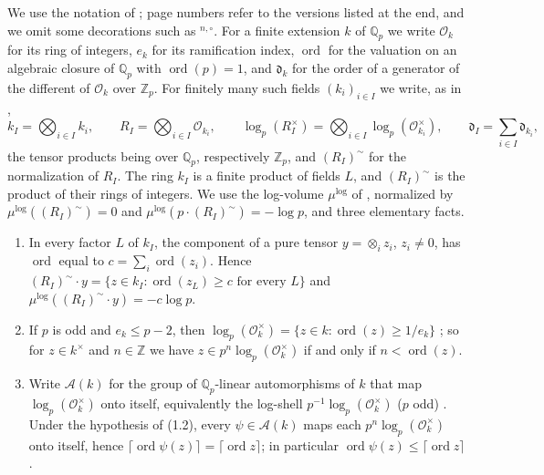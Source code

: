 \documentclass[11pt]{amsart}
\theoremstyle{remark}
\newcommand{\Z}{\mathbb Z}
\newcommand{\Qp}{\mathbb Q_p}
\newcommand{\Zp}{\mathbb Z_p}
\newcommand{\cO}{\mathcal O}
\newcommand{\cA}{\mathcal A}
\newcommand{\dd}{\mathfrak d}
\newcommand{\mulog}{\mu^{\log}}
\newcommand{\RIt}{(R_I)^{\sim}}
\begin{document}
We use the notation of \cite{IUT1,IUT3,IUT4}; page numbers refer to the versions listed at the end, and we
omit some decorations such as ${}^{n,\circ}$. For a finite extension $k$ of $\Qp$ we write $\cO_k$ for its ring
of integers, $e_k$ for its ramification index, $\operatorname{ord}$ for the valuation on an algebraic closure of
$\Qp$ with $\operatorname{ord}(p)=1$, and $\dd_k$ for the order of a generator of the different of $\cO_k$ over
$\Zp$. For finitely many such fields $(k_i)_{i\in I}$ we write, as in \cite[Props.~1.1, 1.2, pp.~9--10]{IUT4},
\[
k_I=\textstyle\bigotimes_{i\in I}k_i,\qquad R_I=\bigotimes_{i\in I}\cO_{k_i},\qquad
\log_p(R_I^\times)=\bigotimes_{i\in I}\log_p(\cO_{k_i}^\times),\qquad \dd_I=\sum_{i\in I}\dd_{k_i},
\]
the tensor products being over $\Qp$, respectively $\Zp$, and $\RIt$ for the normalization of $R_I$. The ring
$k_I$ is a finite product of fields $L$, and $\RIt$ is the product of their rings of integers. We use the
log-volume $\mulog$ of \cite[Prop.~1.4(i), p.~13]{IUT4}, normalized by $\mulog(\RIt)=0$ and
$\mulog(p\cdot\RIt)=-\log p$, and three elementary facts.
\begin{enumerate}
\item[(1.1)] In every factor $L$ of $k_I$, the component of a pure tensor $y=\otimes_i z_i$, $z_i\ne0$, has
  $\operatorname{ord}$ equal to $c=\sum_i\operatorname{ord}(z_i)$. Hence
  $\RIt\cdot y=\{z\in k_I:\operatorname{ord}(z_L)\ge c\text{ for every }L\}$ and $\mulog(\RIt\cdot y)=-c\log p$.
\item[(1.2)] If $p$ is odd and $e_k\le p-2$, then $\log_p(\cO_k^\times)=\{z\in k:\operatorname{ord}(z)\ge 1/e_k\}$
  \cite[Prop.~1.2(i), p.~10]{IUT4}; so for $z\in k^\times$ and $n\in\Z$ we have
  $z\in p^n\log_p(\cO_k^\times)$ if and only if $n<\operatorname{ord}(z)$.
\item[(1.3)] Write $\cA(k)$ for the group of $\Qp$-linear automorphisms of $k$ that map
  $\log_p(\cO_k^\times)$ onto itself, equivalently the log-shell $p^{-1}\log_p(\cO_k^\times)$ ($p$ odd)
  \cite[Rem.~1.2.2(i), p.~36]{IUT3}. Under the hypothesis of (1.2), every $\psi\in\cA(k)$ maps each
  $p^n\log_p(\cO_k^\times)$ onto itself, hence $\lceil\operatorname{ord}\psi(z)\rceil=\lceil\operatorname{ord} z\rceil$;
  in particular $\operatorname{ord}\psi(z)\le\lceil\operatorname{ord} z\rceil$.
\end{enumerate}
\end{document}

